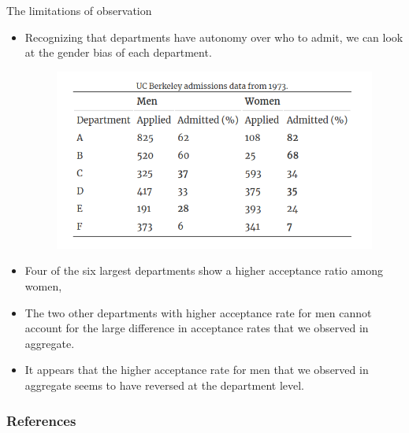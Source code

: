 \documentclass[handout]{beamer}
\begin{document}
\begin{frame}{The limitations of observation}
\scriptsize{
\begin{itemize}

\item Recognizing that departments have autonomy over who to admit, we can look at the gender bias of each department.

\begin{figure}[h!]
	\centering
	\includegraphics[scale=0.4]{pics/berkley.png}
\end{figure}

\item Four of the six largest departments show a higher acceptance ratio among women,
\item The two other departments with higher acceptance rate for men cannot account for the large difference in acceptance rates that we observed in aggregate. 
\item It appears that the higher acceptance rate for men that we observed in aggregate seems to have reversed at the department level.


\end{itemize}

} 

\end{frame}






\begin{frame}[allowframebreaks]\scriptsize
\frametitle{References}


%
\end{frame}  









\end{document}
